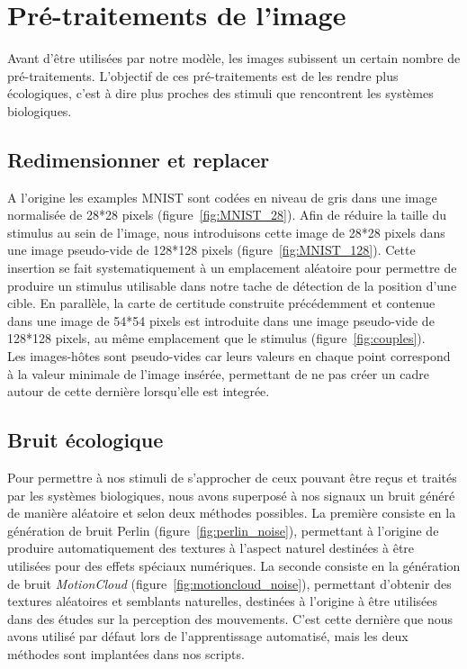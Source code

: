 \section{Pré-traitements de l'image}
Avant d'être utilisées par notre modèle, les images subissent un certain nombre de pré-traitements. 
L'objectif de ces pré-traitements est de les rendre plus écologiques, c'est à dire plus proches des stimuli que rencontrent les systèmes biologiques.

\subsection{Redimensionner et replacer}
A l'origine les examples MNIST sont codées en niveau de gris dans une image normalisée de 28*28 pixels (figure~\ref{fig:MNIST_28}).
Afin de réduire la taille du stimulus au sein de l'image, nous introduisons cette image de 28*28 pixels dans une image pseudo-vide de 128*128 pixels (figure~\ref{fig:MNIST_128}).
Cette insertion se fait systematiquement à un emplacement aléatoire pour permettre de produire un stimulus utilisable dans notre tache de détection de la position d'une cible.
En parallèle, la carte de certitude construite précédemment et contenue dans une image de 54*54 pixels est introduite dans une image pseudo-vide de 128*128 pixels, au même emplacement que le stimulus (figure~\ref{fig:couples}). \\
Les images-hôtes sont pseudo-vides car leurs valeurs en chaque point correspond à la valeur minimale de l'image insérée, permettant de ne pas créer un cadre autour de cette dernière lorsqu'elle est integrée.

\subsection{Bruit écologique}
Pour permettre à nos stimuli de s'approcher de ceux pouvant être reçus et traités par les systèmes biologiques, nous avons superposé à nos signaux un bruit généré de manière aléatoire et selon deux méthodes possibles.
La première consiste en la génération de bruit Perlin \autocite{Perlin1985} (figure~\ref{fig:perlin_noise}), permettant à l'origine de produire automatiquement des textures à l'aspect naturel destinées à être utilisées pour des effets spéciaux numériques.
La seconde consiste en la génération de bruit \textit{MotionCloud} (figure~\ref{fig:motioncloud_noise}), permettant d'obtenir des textures aléatoires et semblants naturelles, destinées à l'origine à être utilisées dans des études sur la perception des mouvements.
C'est cette dernière que nous avons utilisé par défaut lors de l'apprentissage automatisé, mais les deux méthodes sont implantées dans nos scripts. \autocite{Leon2012}

